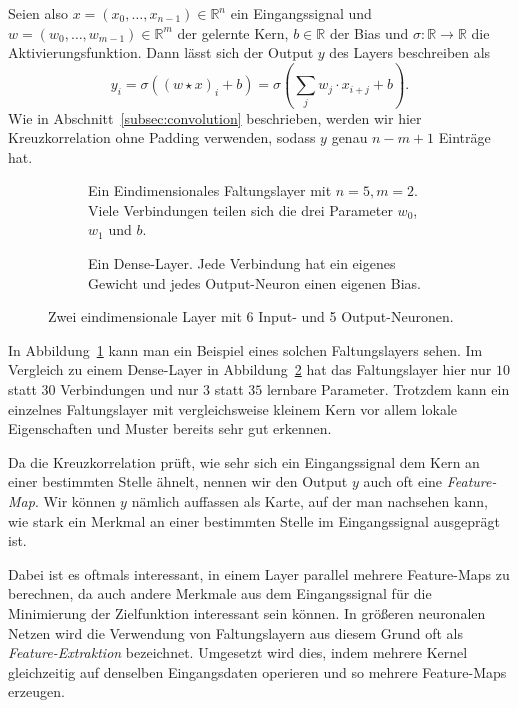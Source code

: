 \documentclass[paper=a4, 	%
		fontsize=11pt, 		%
		abstracton, 	%
		headsepline, 	%
		notitlepage	%
		]{scrartcl}
\theoremstyle{definition}
\newcommand{\R}{\mathbb{R}}
\begin{document}
Seien also $x=(x_0,\dots,x_{n-1})\in\R^n$ ein Eingangssignal und $w=(w_0,\dots,w_{m-1})\in\R^m$ der gelernte Kern, $b\in\R$ der Bias und $\sigma: \R\rightarrow\R$ die Aktivierungsfunktion.
Dann lässt sich der Output $y$ des Layers beschreiben als
\[
    y_i = \sigma\left( (w \star x)_i + b  \right)
    = \sigma\left( \sum_j w_j \cdot x_{i+j} + b \right).
\]
Wie in Abschnitt~\ref{subsec:convolution} beschrieben, werden wir hier Kreuzkorrelation ohne Padding verwenden, sodass $y$ genau ${n-m+1}$ Einträge hat.


\begin{figure}
\begin{subfigure}{0.5\textwidth}
    \centering
    
    \caption{Ein Eindimensionales Faltungslayer mit $n=5,m=2$.
    Viele Verbindungen teilen sich die drei Parameter $w_0$, $w_1$ und $b$.
    }
    \label{fig:one-dimensional-conv-layer}
\end{subfigure}%
\begin{subfigure}{0.5\textwidth}
    \centering
    
    \caption{Ein Dense-Layer. Jede Verbindung hat ein eigenes Gewicht und jedes Output-Neuron einen eigenen Bias.}
    \label{fig:one-dimensional-dense-layer}
\end{subfigure}
    \caption{Zwei eindimensionale Layer mit 6 Input- und 5 Output-Neuronen.}
    \label{fig:one-dimensional-layers}
\end{figure}

In Abbildung~\ref{fig:one-dimensional-conv-layer} kann man ein Beispiel eines solchen Faltungslayers sehen.
Im Vergleich zu einem Dense-Layer in Abbildung~\ref{fig:one-dimensional-dense-layer} hat das Faltungslayer hier nur $10$ statt $30$ Verbindungen und nur $3$ statt $35$ lernbare Parameter.
Trotzdem kann ein einzelnes Faltungslayer mit vergleichsweise kleinem Kern vor allem lokale Eigenschaften und Muster bereits sehr gut erkennen.

Da die Kreuzkorrelation prüft, wie sehr sich ein Eingangssignal dem Kern an einer bestimmten Stelle ähnelt, nennen wir den Output $y$ auch oft eine \emph{Feature-Map}.
Wir können $y$ nämlich auffassen als Karte, auf der man nachsehen kann, wie stark ein Merkmal an einer bestimmten Stelle im Eingangssignal ausgeprägt ist.

Dabei ist es oftmals interessant, in einem Layer parallel mehrere Feature-Maps zu berechnen, da auch andere Merkmale aus dem Eingangssignal für die Minimierung der Zielfunktion interessant sein können.
In größeren neuronalen Netzen wird die Verwendung von Faltungslayern aus diesem Grund oft als \emph{Feature-Extraktion} bezeichnet.
Umgesetzt wird dies, indem mehrere Kernel gleichzeitig auf denselben Eingangsdaten operieren und so mehrere Feature-Maps erzeugen.
\end{document}
